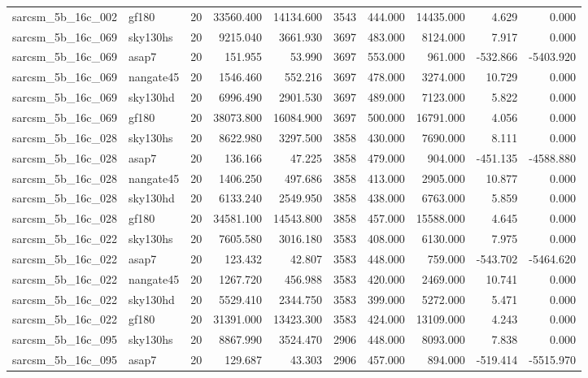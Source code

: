 \begin{tabular}{llrrrrrrrr}
sarcsm\_5b\_16c\_002 & gf180 & 20 & 33560.400 & 14134.600 & 3543 & 444.000 & 14435.000 & 4.629 & 0.000 \\
sarcsm\_5b\_16c\_069 & sky130hs & 20 & 9215.040 & 3661.930 & 3697 & 483.000 & 8124.000 & 7.917 & 0.000 \\
sarcsm\_5b\_16c\_069 & asap7 & 20 & 151.955 & 53.990 & 3697 & 553.000 & 961.000 & -532.866 & -5403.920 \\
sarcsm\_5b\_16c\_069 & nangate45 & 20 & 1546.460 & 552.216 & 3697 & 478.000 & 3274.000 & 10.729 & 0.000 \\
sarcsm\_5b\_16c\_069 & sky130hd & 20 & 6996.490 & 2901.530 & 3697 & 489.000 & 7123.000 & 5.822 & 0.000 \\
sarcsm\_5b\_16c\_069 & gf180 & 20 & 38073.800 & 16084.900 & 3697 & 500.000 & 16791.000 & 4.056 & 0.000 \\
sarcsm\_5b\_16c\_028 & sky130hs & 20 & 8622.980 & 3297.500 & 3858 & 430.000 & 7690.000 & 8.111 & 0.000 \\
sarcsm\_5b\_16c\_028 & asap7 & 20 & 136.166 & 47.225 & 3858 & 479.000 & 904.000 & -451.135 & -4588.880 \\
sarcsm\_5b\_16c\_028 & nangate45 & 20 & 1406.250 & 497.686 & 3858 & 413.000 & 2905.000 & 10.877 & 0.000 \\
sarcsm\_5b\_16c\_028 & sky130hd & 20 & 6133.240 & 2549.950 & 3858 & 438.000 & 6763.000 & 5.859 & 0.000 \\
sarcsm\_5b\_16c\_028 & gf180 & 20 & 34581.100 & 14543.800 & 3858 & 457.000 & 15588.000 & 4.645 & 0.000 \\
sarcsm\_5b\_16c\_022 & sky130hs & 20 & 7605.580 & 3016.180 & 3583 & 408.000 & 6130.000 & 7.975 & 0.000 \\
sarcsm\_5b\_16c\_022 & asap7 & 20 & 123.432 & 42.807 & 3583 & 448.000 & 759.000 & -543.702 & -5464.620 \\
sarcsm\_5b\_16c\_022 & nangate45 & 20 & 1267.720 & 456.988 & 3583 & 420.000 & 2469.000 & 10.741 & 0.000 \\
sarcsm\_5b\_16c\_022 & sky130hd & 20 & 5529.410 & 2344.750 & 3583 & 399.000 & 5272.000 & 5.471 & 0.000 \\
sarcsm\_5b\_16c\_022 & gf180 & 20 & 31391.000 & 13423.300 & 3583 & 424.000 & 13109.000 & 4.243 & 0.000 \\
sarcsm\_5b\_16c\_095 & sky130hs & 20 & 8867.990 & 3524.470 & 2906 & 448.000 & 8093.000 & 7.838 & 0.000 \\
sarcsm\_5b\_16c\_095 & asap7 & 20 & 129.687 & 43.303 & 2906 & 457.000 & 894.000 & -519.414 & -5515.970 \\

\end{tabular}

